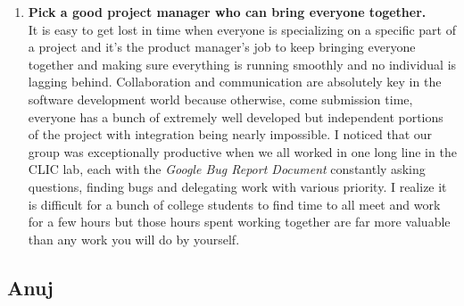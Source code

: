 \documentclass[12pt]{report}
\begin{document}
\begin{enumerate}
\item \textbf{Pick a good project manager who can bring everyone together.}\\
It is easy to get lost in time when everyone is specializing on a specific part of a project and it's the product manager's job to keep bringing everyone together and making sure everything is running smoothly and no individual is lagging behind. Collaboration and communication are absolutely key in the software development world because otherwise, come submission time, everyone has a bunch of extremely well developed but independent portions of the project with integration being nearly impossible. I noticed that our group was exceptionally productive when we all worked in one long line in the CLIC lab, each with the \textit{Google Bug Report Document} constantly asking questions, finding bugs and delegating work with various priority. I realize it is difficult for a bunch of college students to find time to all meet and work for a few hours but those hours spent working together are far more valuable than any work you will do by yourself.
\end{enumerate}

\subsection{Anuj}
\end{document}
